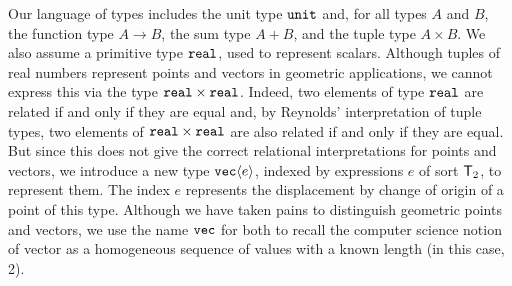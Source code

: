 Our language of types includes the unit type $\textup{\texttt{unit}}$ and,
for all types $A$ and $B$, the function type $A \to B$, the sum type
$A + B$, and the tuple type $A \times B$. We also assume a primitive
type $\textup{\texttt{real}}$, used to represent scalars. Although tuples of
real numbers represent points and vectors in geometric applications,
we cannot express this via the type
$\textup{\texttt{real}} \times \textup{\texttt{real}}$. Indeed,
two elements of type $\textup{\texttt{real}}$ are related if and only if they
are equal and, by Reynolds' interpretation of tuple types, two
elements of $\textup{\texttt{real}} \times \textup{\texttt{real}}$ are also related
if and only if they are equal. But since this does not give the
correct relational interpretations for points and vectors, we
introduce a new type $\textup{\texttt{vec}}\langle e \rangle$, indexed by expressions $e$ of
sort $\mathsf{T}_2$, to represent them.  The index $e$ represents the
displacement by change of origin of a point of this type.  Although we
have taken pains to distinguish geometric points and vectors, we use
the name $\textup{\texttt{vec}}$ for both to recall the computer science
notion of vector as a homogeneous sequence of values with a known
length (in this case, 2).

